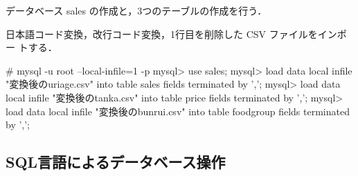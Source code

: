 データベース sales の作成と，3つのテーブルの作成を行う．


日本語コード変換，改行コード変換，1行目を削除した CSV ファイルをインポー
トする．

\begin{cli}
# mysql -u root --local-infile=1 -p
mysql> use sales;
mysql> load data local infile "変換後のuriage.csv" into table
 sales fields terminated by ',';
mysql> load data local infile "変換後のtanka.csv" into table price
 fields terminated by ',';
mysql> load data local infile "変換後のbunrui.csv" into table
 foodgroup fields terminated by ',';
\end{cli}

\subsection{SQL言語によるデータベース操作}
\label{sec:sql-lang}

